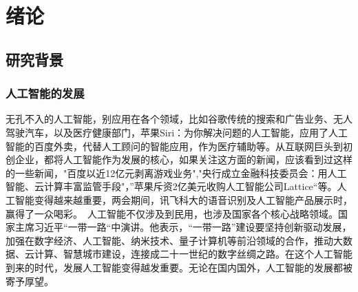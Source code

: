 \chapter{绪论}
	\section{研究背景}

	\subsection{人工智能的发展}
 	无孔不入的人工智能，别应用在各个领域，比如谷歌传统的搜索和广告业务、无人驾驶汽车，以及医疗健康部门，苹果Siri：为你解决问题的人工智能，应用了人工智能的百度外卖，代替人工顾问的智能应用，作为医疗辅助等。从互联网巨头到初创企业，都将人工智能作为发展的核心，如果关注这方面的新闻，应该看到过这样的一些新闻，"百度以近12亿元剥离游戏业务","央行成立金融科技委员会：用人工智能、云计算丰富监管手段"，”苹果斥资2亿美元收购人工智能公司Lattice“等。人工智能变得越来越重要，两会期间，讯飞科大的语音识别及人工智能产品展示时，赢得了一众喝彩。　人工智能不仅涉及到民用，也涉及国家各个核心战略领域。国家主席习近平“一带一路“中演讲。他表示，“一带一路”建设要坚持创新驱动发展，加强在数字经济、人工智能、纳米技术、量子计算机等前沿领域的合作，推动大数据、云计算、智慧城市建设，连接成二十一世纪的数字丝绸之路。在这个人工智能到来的时代，发展人工智能变得越发重要。无论在国内国外，人工智能的发展都被寄予厚望。
	

